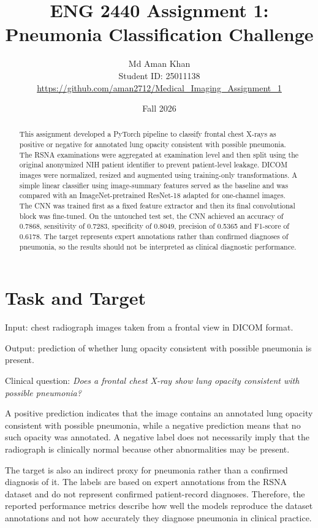\documentclass[10pt,a4paper]{article}
\title{ENG 2440 Assignment 1: Pneumonia Classification Challenge}
\author{Md Aman Khan\\Student ID: 25011138\\\url{https://github.com/aman2712/Medical_Imaging_Assignment_1}}
\date{Fall 2026}
\begin{document}
\maketitle
\vspace*{0.35in}

\begin{abstract}
This assignment developed a PyTorch pipeline to classify frontal chest X-rays as positive or negative for annotated lung opacity consistent with possible pneumonia. The RSNA examinations were aggregated at examination level and then split using the original anonymized NIH patient identifier to prevent patient-level leakage. DICOM images were normalized, resized and augmented using training-only transformations. A simple linear classifier using image-summary features served as the baseline and was compared with an ImageNet-pretrained ResNet-18 adapted for one-channel images. The CNN was trained first as a fixed feature extractor and then its final convolutional block was fine-tuned. On the untouched test set, the CNN achieved an accuracy of 0.7868, sensitivity of 0.7283, specificity of 0.8049, precision of 0.5365 and F1-score of 0.6178. The target represents expert annotations rather than confirmed diagnoses of pneumonia, so the results should not be interpreted as clinical diagnostic performance.
\end{abstract}

\section{Task and Target}
Input: chest radiograph images taken from a frontal view in DICOM format.

Output: prediction of whether lung opacity consistent with possible pneumonia is present.

Clinical question: \emph{Does a frontal chest X-ray show lung opacity consistent with possible pneumonia?}

A positive prediction indicates that the image contains an annotated lung opacity consistent with possible pneumonia, while a negative prediction means that no such opacity was annotated. A negative label does not necessarily imply that the radiograph is clinically normal because other abnormalities may be present.

The target is also an indirect proxy for pneumonia rather than a confirmed diagnosis of it. The labels are based on expert annotations from the RSNA dataset and do not represent confirmed patient-record diagnoses. Therefore, the reported performance metrics describe how well the models reproduce the dataset annotations and not how accurately they diagnose pneumonia in clinical practice.
\end{document}

